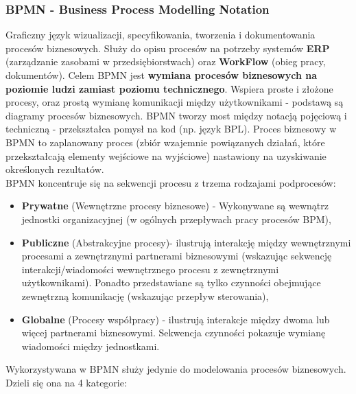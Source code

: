 \subsubsection{BPMN - Business Process Modelling Notation}

Graficzny język wizualizacji, specyfikowania, tworzenia i dokumentowania procesów biznesowych. Służy do opisu procesów na potrzeby systemów \textbf{ERP} (zarządzanie zasobami w przedsiębiorstwach) oraz \textbf{WorkFlow} (obieg pracy, dokumentów). Celem BPMN jest \textbf{wymiana procesów biznesowych na poziomie ludzi zamiast poziomu technicznego}. Wspiera proste i złożone procesy, oraz prostą wymianę komunikacji między użytkownikami - podstawą są diagramy procesów biznesowych. BPMN tworzy most między notacją pojęciową i techniczną - przekształca pomysł na kod (np. język BPL). Proces biznesowy w BPMN to zaplanowany proces (zbiór wzajemnie powiązanych działań, które przekształcają elementy wejściowe na wyjściowe) nastawiony na uzyskiwanie określonych rezultatów. \\

BPMN koncentruje się na sekwencji procesu z trzema rodzajami podprocesów:

\begin{itemize}
	\item \textbf{Prywatne} (Wewnętrzne procesy biznesowe) - Wykonywane są wewnątrz jednostki organizacyjnej (w ogólnych przepływach pracy procesów BPM),
	\item \textbf{Publiczne} (Abstrakcyjne procesy)- ilustrują interakcję między wewnętrznymi procesami a zewnętrznymi partnerami biznesowymi (wskazując sekwencję interakcji/wiadomości wewnętrznego procesu z zewnętrznymi użytkownikami). Ponadto przedstawiane są tylko czynności obejmujące zewnętrzną komunikację (wskazując przepływ sterowania),
	\item \textbf{Globalne} (Procesy współpracy) - ilustrują interakcje między dwoma lub więcej partnerami biznesowymi. Sekwencja czynności pokazuje wymianę wiadomości między jednostkami. \\
\end{itemize}

Wykorzystywana w BPMN służy jedynie do modelowania procesów biznesowych. Dzieli się ona na 4 kategorie:

